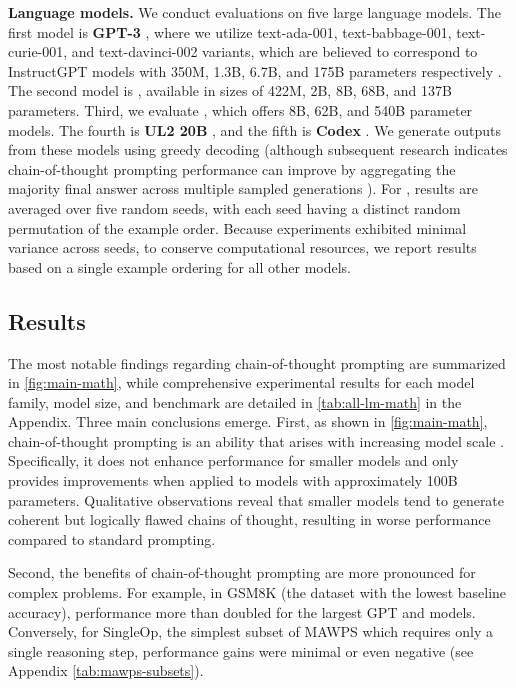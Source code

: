 \textbf{Language models.} We conduct evaluations on five large language models. The first model is \textbf{GPT-3} \citep{brown2020language}, where we utilize text-ada-001, text-babbage-001, text-curie-001, and text-davinci-002 variants, which are believed to correspond to InstructGPT models with 350M, 1.3B, 6.7B, and 175B parameters respectively \citep{ouyang2022training}. The second model is \textbf{\lamda{}} \citep{thoppilan2022lamda}, available in sizes of 422M, 2B, 8B, 68B, and 137B parameters. Third, we evaluate \textbf{\palm{}}, which offers 8B, 62B, and 540B parameter models. The fourth is \textbf{UL2 20B} \citep{tay2022unifying}, and the fifth is \textbf{Codex} \citep[][code-davinci-002 in the OpenAI API]{chen2021evaluating}. We generate outputs from these models using greedy decoding (although subsequent research indicates chain-of-thought prompting performance can improve by aggregating the majority final answer across multiple sampled generations \citep{wang2022self}). For \lamda{}, results are averaged over five random seeds, with each seed having a distinct random permutation of the example order. Because \lamda{} experiments exhibited minimal variance across seeds, to conserve computational resources, we report results based on a single example ordering for all other models.

\subsection{Results}
The most notable findings regarding chain-of-thought prompting are summarized in \cref{fig:main-math}, while comprehensive experimental results for each model family, model size, and benchmark are detailed in \cref{tab:all-lm-math} in the Appendix. Three main conclusions emerge. First, as shown in \cref{fig:main-math}, chain-of-thought prompting is an ability that arises with increasing model scale \citep{wei2022emergent}. Specifically, it does not enhance performance for smaller models and only provides improvements when applied to models with approximately 100B parameters. Qualitative observations reveal that smaller models tend to generate coherent but logically flawed chains of thought, resulting in worse performance compared to standard prompting.


Second, the benefits of chain-of-thought prompting are more pronounced for complex problems. For example, in GSM8K (the dataset with the lowest baseline accuracy), performance more than doubled for the largest GPT and \palm{} models. Conversely, for SingleOp, the simplest subset of MAWPS which requires only a single reasoning step, performance gains were minimal or even negative (see Appendix \cref{tab:mawps-subsets}).

